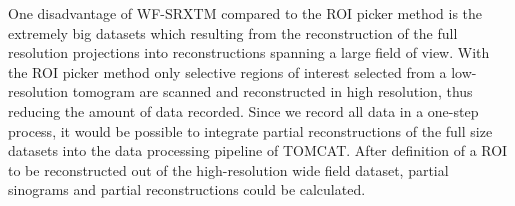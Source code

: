 One disadvantage of WF-SRXTM compared to the ROI picker method is the extremely big datasets which resulting from the reconstruction of the full resolution projections into reconstructions spanning a large field of view. With the ROI picker method only selective regions of interest selected from a low-resolution tomogram are scanned and reconstructed in high resolution, thus reducing the amount of data recorded. Since we record all data in a one-step process, it would be possible to integrate partial reconstructions of the full size datasets into the data processing pipeline of TOMCAT. After definition of a ROI to be reconstructed out of the high-resolution wide field dataset, partial sinograms and partial reconstructions could be calculated.